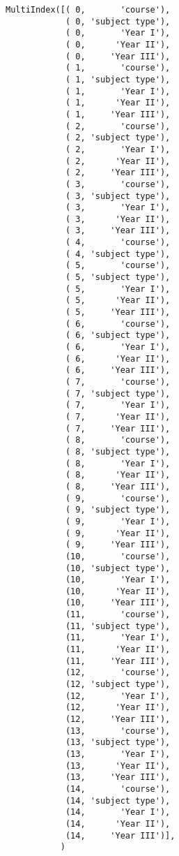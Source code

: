 \documentclass[11pt]{article}
\makeatletter
\newcommand{\boxspacing}{\kern\kvtcb@left@rule\kern\kvtcb@boxsep}
\newcommand{\prompt}[4]{
        {\ttfamily\llap{{\color{#2}[#3]:\hspace{3pt}#4}}\vspace{-\baselineskip}}
    }
\makeatother
\begin{document}
            \begin{tcolorbox}[breakable, size=fbox, boxrule=.5pt, pad at break*=1mm, opacityfill=0]
\prompt{Out}{outcolor}{99}{\boxspacing}
\begin{Verbatim}[commandchars=\\\{\}]
MultiIndex([( 0,       'course'),
            ( 0, 'subject type'),
            ( 0,       'Year I'),
            ( 0,      'Year II'),
            ( 0,     'Year III'),
            ( 1,       'course'),
            ( 1, 'subject type'),
            ( 1,       'Year I'),
            ( 1,      'Year II'),
            ( 1,     'Year III'),
            ( 2,       'course'),
            ( 2, 'subject type'),
            ( 2,       'Year I'),
            ( 2,      'Year II'),
            ( 2,     'Year III'),
            ( 3,       'course'),
            ( 3, 'subject type'),
            ( 3,       'Year I'),
            ( 3,      'Year II'),
            ( 3,     'Year III'),
            ( 4,       'course'),
            ( 4, 'subject type'),
            ( 5,       'course'),
            ( 5, 'subject type'),
            ( 5,       'Year I'),
            ( 5,      'Year II'),
            ( 5,     'Year III'),
            ( 6,       'course'),
            ( 6, 'subject type'),
            ( 6,       'Year I'),
            ( 6,      'Year II'),
            ( 6,     'Year III'),
            ( 7,       'course'),
            ( 7, 'subject type'),
            ( 7,       'Year I'),
            ( 7,      'Year II'),
            ( 7,     'Year III'),
            ( 8,       'course'),
            ( 8, 'subject type'),
            ( 8,       'Year I'),
            ( 8,      'Year II'),
            ( 8,     'Year III'),
            ( 9,       'course'),
            ( 9, 'subject type'),
            ( 9,       'Year I'),
            ( 9,      'Year II'),
            ( 9,     'Year III'),
            (10,       'course'),
            (10, 'subject type'),
            (10,       'Year I'),
            (10,      'Year II'),
            (10,     'Year III'),
            (11,       'course'),
            (11, 'subject type'),
            (11,       'Year I'),
            (11,      'Year II'),
            (11,     'Year III'),
            (12,       'course'),
            (12, 'subject type'),
            (12,       'Year I'),
            (12,      'Year II'),
            (12,     'Year III'),
            (13,       'course'),
            (13, 'subject type'),
            (13,       'Year I'),
            (13,      'Year II'),
            (13,     'Year III'),
            (14,       'course'),
            (14, 'subject type'),
            (14,       'Year I'),
            (14,      'Year II'),
            (14,     'Year III')],
           )
\end{Verbatim}
\end{tcolorbox}
        
\end{document}
